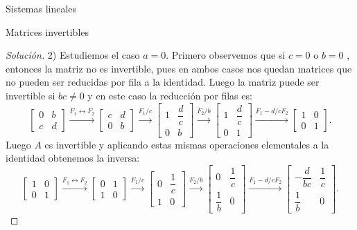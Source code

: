 \documentclass[a4paper,12pt,twoside,spanish]{amsbook}
\theoremstyle{definition}
\theoremstyle{remark}
\begin{document}
\begin{chapter}{Sistemas lineales}
\begin{section}{Matrices invertibles}
\begin{proof}[Solución]
				2) Estudiemos el caso $a=0$. Primero observemos que si $c=0$ o $b=0$ , entonces la matriz no es invertible, pues en ambos casos nos quedan matrices que no pueden ser reducidas por fila a la identidad. Luego la matriz puede ser invertible si $bc\not=0$ y en este caso la reducción por filas es:
				\begin{equation*}
				\begin{bmatrix}0&b\\c&d\end{bmatrix} \stackrel{F_1\leftrightarrow F_2}{\longrightarrow}
				\begin{bmatrix}c&d\\0&b\end{bmatrix} \stackrel{F_1/c}{\longrightarrow}
				\begin{bmatrix}1&\dfrac{d}{c}\\[6pt]0&b\end{bmatrix} \stackrel{F_2/b}{\longrightarrow}
				\begin{bmatrix}1&\dfrac{d}{c}\\[6pt]0&1\end{bmatrix}
				\stackrel{F_1 - d/c F_2}{\longrightarrow}
				\begin{bmatrix}1&0\\0&1\end{bmatrix}.
				\end{equation*}   
				Luego $A$  es invertible y aplicando estas mismas operaciones elementales a la identidad  obtenemos la inversa:
				\begin{equation*}
				\begin{bmatrix}1&0\\0&1\end{bmatrix} \stackrel{F_1\leftrightarrow F_2}{\longrightarrow}
				\begin{bmatrix}0&1\\1&0\end{bmatrix} \stackrel{F_1/c}{\longrightarrow}
				\begin{bmatrix}0&\dfrac{1}{c}\\[6pt]1&0\end{bmatrix} \stackrel{F_2/b}{\longrightarrow}
				\begin{bmatrix}0&\dfrac{1}{c}\\[6pt]\dfrac{1}{b}&0\end{bmatrix}
				\stackrel{F_1 - d/c F_2}{\longrightarrow}
				\begin{bmatrix}-\dfrac{d}{bc}&\dfrac{1}{c}\\[6pt]\dfrac{1}{b}&0\end{bmatrix}.

\end{equation*}
\end{proof}
\end{section}
\end{chapter}
\end{document}
